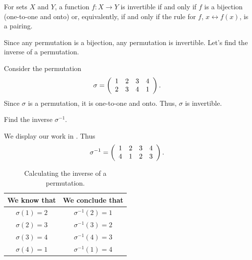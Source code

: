 \begin{thm}
\label{thm_invertible_fn} 
    For sets $X$ and $Y$, a function $f: X \to Y$ is invertible if and only if $f$ is a bijection (one-to-one and onto) or, equivalently, if and only if the rule for $f$, $x \leftrightarrow f(x)$, is a pairing.
\end{thm}

Since any permutation is a bijection, any permutation is invertible.  Let's find the inverse of a permutation.

\begin{exam}
\label{exam_inverse_perm}
    Consider the permutation 
        $$\sigma = 
        \left(\begin{array} {ccc c}
        1 & 2 & 3 & 4 \\
        2 & 3 & 4 & 1
        \end{array} \right).$$
    Since $\sigma$ is a permutation, it is one-to-one and onto. Thus, $\sigma$ is invertible.
        \begin{apart}
            \item Find the inverse $\sigma^{-1}$.
                \begin{soln}
                    We display our work in . Thus $$\sigma^{-1} = 
                        \left(\begin{array} {ccc c}
                            1 & 2 & 3 & 4 \\
                            4 & 1 & 2 & 3
                        \end{array} \right).$$
                \end{soln}
                    \begin{table}[hbtp]
                        \centering
                        \begin{tabular}{c|c}
                             We know that & We conclude that \\ \hline
                             $\sigma(1) = 2$ &  $\sigma^{-1}(2)=1$\\ \hline
                             $\sigma(2) = 3$ &  $\sigma^{-1}(3)=2$\\ \hline
                             $\sigma(3) = 4$ &  $\sigma^{-1}(4)=3$\\ \hline
                             $\sigma(4) = 1$ &  $\sigma^{-1}(1)=4$
                        \end{tabular}
                        \caption{Calculating the inverse of a permutation.}
                        \label{tab_inv_perm}
                    \end{table}
                

\end{apart}
\end{exam}

